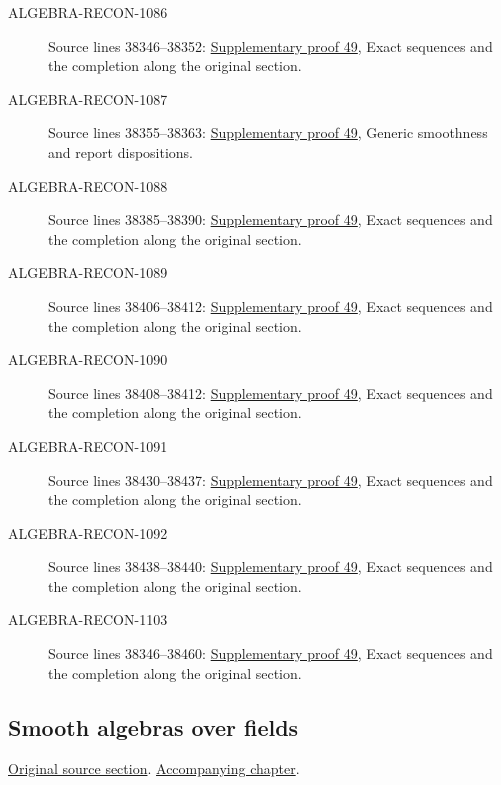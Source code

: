\begin{description}
\item[ALGEBRA-RECON-1086] Source lines 38346--38352: \hyperlink{algebra_smooth_fields_notes_20260928}{Supplementary proof 49}, Exact sequences and the completion along the original section.
\item[ALGEBRA-RECON-1087] Source lines 38355--38363: \hyperlink{algebra_smooth_fields_notes_20260928}{Supplementary proof 49}, Generic smoothness and report dispositions.
\item[ALGEBRA-RECON-1088] Source lines 38385--38390: \hyperlink{algebra_smooth_fields_notes_20260928}{Supplementary proof 49}, Exact sequences and the completion along the original section.
\item[ALGEBRA-RECON-1089] Source lines 38406--38412: \hyperlink{algebra_smooth_fields_notes_20260928}{Supplementary proof 49}, Exact sequences and the completion along the original section.
\item[ALGEBRA-RECON-1090] Source lines 38408--38412: \hyperlink{algebra_smooth_fields_notes_20260928}{Supplementary proof 49}, Exact sequences and the completion along the original section.
\item[ALGEBRA-RECON-1091] Source lines 38430--38437: \hyperlink{algebra_smooth_fields_notes_20260928}{Supplementary proof 49}, Exact sequences and the completion along the original section.
\item[ALGEBRA-RECON-1092] Source lines 38438--38440: \hyperlink{algebra_smooth_fields_notes_20260928}{Supplementary proof 49}, Exact sequences and the completion along the original section.
\item[ALGEBRA-RECON-1103] Source lines 38346--38460: \hyperlink{algebra_smooth_fields_notes_20260928}{Supplementary proof 49}, Exact sequences and the completion along the original section.
\end{description}

\subsection{Smooth algebras over fields}
\hypertarget{algebra-source-section-smooth-over-field}{}
\noindent\href{https://github.com/stacks/stacks-project/blob/a04446e57ec1fbc252a871afcec7752fb2807b14/algebra.tex\#L38467}{Original source section}. \href{algebra.pdf\#nameddest=section-smooth-over-field}{Accompanying chapter}.

